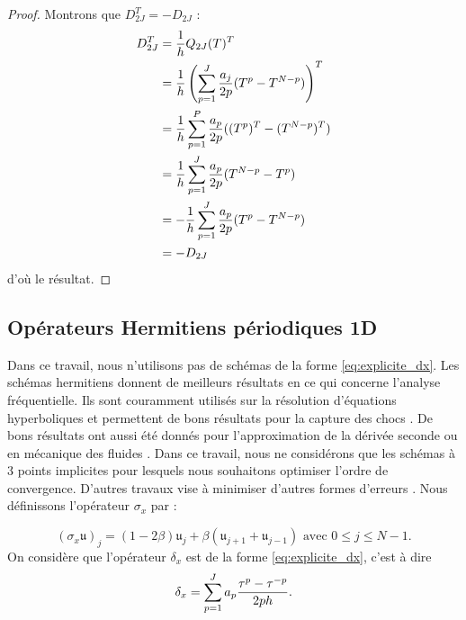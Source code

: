 \begin{proof}
Montrons que $D_{2J}^T = - D_{2J}$ :
\begin{align*}
D_{2J}^T & = \dfrac{1}{h} Q_{2J}(T)^T \\
	& = \dfrac{1}{h} \left( \displaystyle\sum\limits_{p=1}^J \dfrac{a_j}{2p} (T^p - T^{N-p}) \right)^T\\
	& = \dfrac{1}{h}\displaystyle\sum\limits_{p=1}^P \dfrac{a_p}{2p} ((T^p)^T - (T^{N-p})^T) \\
	& = \dfrac{1}{h}\displaystyle\sum\limits_{p=1}^J \dfrac{a_p}{2p} (T^{N-p} - T^{p}) \\
	& = - \dfrac{1}{h} \displaystyle\sum\limits_{p=1}^J \dfrac{a_p}{2p} (T^p - T^{N-p}) \\
	& = - D_{2J}
\end{align*}
d'où le résultat.
\end{proof}




























\subsection{Opérateurs Hermitiens périodiques 1D}

Dans ce travail, nous n'utilisons pas de schémas de la forme \eqref{eq:explicite_dx}. Les schémas hermitiens \cite{Lele1991} donnent de meilleurs résultats en ce qui concerne l'analyse fréquentielle. Ils sont couramment utilisés sur la résolution d'équations hyperboliques \cite{Chu1998} et permettent de bons résultats pour la capture des chocs \cite{Jiang2001}. De bons résultats ont aussi été donnés pour l'approximation de la dérivée seconde \cite{Abbas2011, Keller1971} ou en mécanique des fluides \cite{BenArtzi2005, BenArtzi2013}. Dans ce travail, nous ne considérons que les schémas à 3 points implicites pour lesquels nous souhaitons optimiser l'ordre de convergence. D'autres travaux vise à minimiser d'autres formes d'erreurs \cite{Kim1996, Kim2007}. Nous définissons l'opérateur $\sigma_{x}$ par :

\begin{equation}
(\sigma_{x} \mathfrak{u})_j = (1-2\beta) \mathfrak{u}_j + \beta \left( \mathfrak{u}_{j+1} + \mathfrak{u}_{j-1} \right) \text{ avec } 0 \leq j \leq N-1.
\end{equation}
On considère que l'opérateur $\delta_x$ est de la forme \eqref{eq:explicite_dx}, c'est à dire
\begin{equation}
\delta_x = \displaystyle\sum\limits_{p=1}^J a_p \dfrac{\tau^p - \tau^{-p}}{2ph}.
\end{equation}

